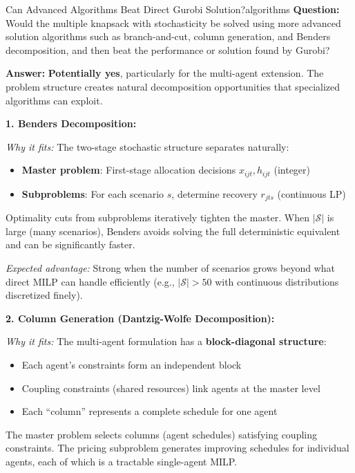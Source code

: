 \documentclass[11pt,a4paper]{article}
\begin{document}
\begin{questionbox}{Can Advanced Algorithms Beat Direct Gurobi Solution?}{algorithms}
\textbf{Question:} Would the multiple knapsack with stochasticity be solved using more advanced solution algorithms such as branch-and-cut, column generation, and Benders decomposition, and then beat the performance or solution found by Gurobi?

\textbf{Answer:} \textbf{Potentially yes}, particularly for the multi-agent extension. The problem structure creates natural decomposition opportunities that specialized algorithms can exploit.

\textbf{1. Benders Decomposition:}

\textit{Why it fits:} The two-stage stochastic structure separates naturally:
\begin{itemize}
    \item \textbf{Master problem}: First-stage allocation decisions $x_{ijt}, h_{ijt}$ (integer)
    \item \textbf{Subproblems}: For each scenario $s$, determine recovery $r_{jts}$ (continuous LP)
\end{itemize}

Optimality cuts from subproblems iteratively tighten the master. When $|\mathcal{S}|$ is large (many scenarios), Benders avoids solving the full deterministic equivalent and can be significantly faster.

\textit{Expected advantage:} Strong when the number of scenarios grows beyond what direct MILP can handle efficiently (e.g., $|\mathcal{S}| > 50$ with continuous distributions discretized finely).

\textbf{2. Column Generation (Dantzig-Wolfe Decomposition):}

\textit{Why it fits:} The multi-agent formulation has a \textbf{block-diagonal structure}:
\begin{itemize}
    \item Each agent's constraints form an independent block
    \item Coupling constraints (shared resources) link agents at the master level
    \item Each ``column'' represents a complete schedule for one agent
\end{itemize}

The master problem selects columns (agent schedules) satisfying coupling constraints. The pricing subproblem generates improving schedules for individual agents, each of which is a tractable single-agent MILP.


\end{questionbox}
\end{document}
